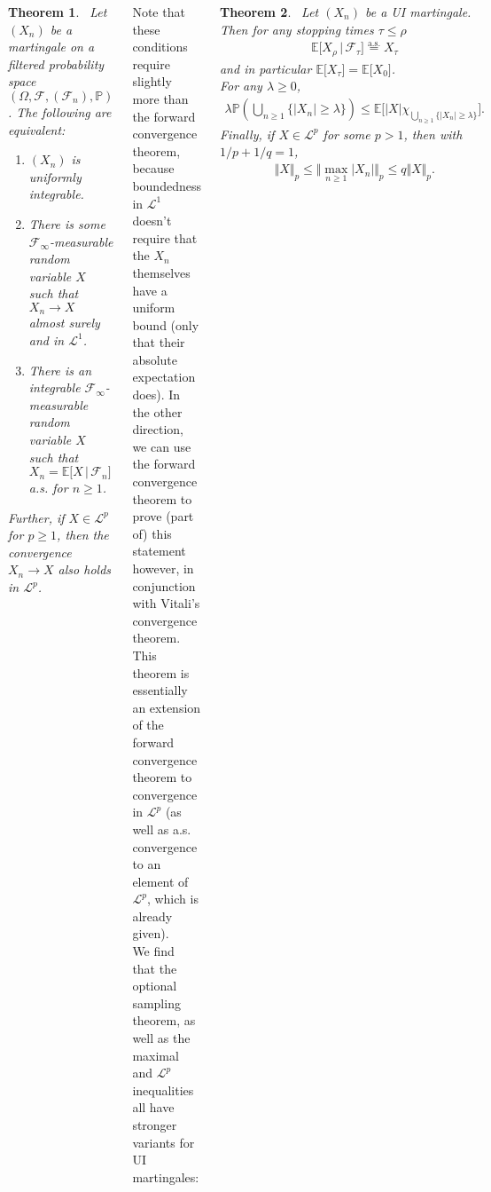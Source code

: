 \documentclass{tikzposter} %
\newtheorem{theorem}{Theorem}
\begin{document}
\begin{columns}
{    \begin{theorem}
    \ Let $(X_{n})$ be a martingale on a filtered probability space $(\Omega, \mathcal{F}, (\mathcal{F}_{n}), \mathbb{P})$. The following are equivalent:
    \begin{enumerate}[label=\roman*.]
            \item $(X_{n})$ is uniformly integrable.
            \item There is some $\mathcal{F}_{\infty}$-measurable random variable $X$ such that $X_{n} \to X$ almost surely and in $\mathcal{L}^{1}$.
            \item There is an integrable $\mathcal{F}_{\infty}$-measurable random variable $X$ such that $X_{n} = \mathbb{E}\big[X \,|\, \mathcal{F}_{n}\big]$ a.s. for $n \ge 1$.
    \end{enumerate}
    Further, if $X \in \mathcal{L}^{p}$ for $p \ge 1$, then the convergence $X_{n} \to X$ also holds in $\mathcal{L}^{p}$.
    \end{theorem}
    \hphantom{}

    Note that these conditions require slightly more than the forward convergence theorem, because boundedness in $\mathcal{L}^{1}$ doesn't require that the $X_{n}$ themselves have a uniform bound (only that their absolute expectation does). In the other direction, we can use the forward convergence theorem to prove (part of) this statement however, in conjunction with Vitali's convergence theorem. \\

    This theorem is essentially an extension of the forward convergence theorem to convergence in $\mathcal{L}^{p}$ (as well as a.s. convergence to an element of $\mathcal{L}^{p}$, which is already given). \\

    We find that the optional sampling theorem, as well as the maximal and $\mathcal{L}^{p}$ inequalities all have stronger variants for UI martingales:
    \begin{theorem}
    \ Let $(X_{n})$ be a UI martingale. Then for any stopping times $\tau \le \rho$
    \begin{align*}
      \mathbb{E}\big[X_{\rho} \,|\, \mathcal{F}_{\tau}\big] \overset{\mathrm{a.s.}}{=} X_{\tau}
    \end{align*}
    and in particular $\mathbb{E}\big[X_{\tau}\big] = \mathbb{E}\big[X_{0}\big]$. \\

    For any $\lambda \ge 0$,
    \begin{align*}
      \lambda \mathbb{P}\left(\bigcup_{n \ge 1} \{|X_{n}| \ge \lambda\}\right) \le \mathbb{E}\big[|X|\chi_{\bigcup_{n \ge 1} \{|X_{n}| \ge \lambda\}}\big].
    \end{align*}
    Finally, if $X \in \mathcal{L}^{p}$ for some $p > 1$, then with $1/p+1/q = 1$,
    \begin{align*}
      \Vert X \Vert_{p} \le \Vert \max_{n \ge 1} |X_{n}| \Vert_{p} \le q \Vert X \Vert_{p}.
    \end{align*}
    \end{theorem}
    \hphantom{}

}
\end{columns}
\end{document}
